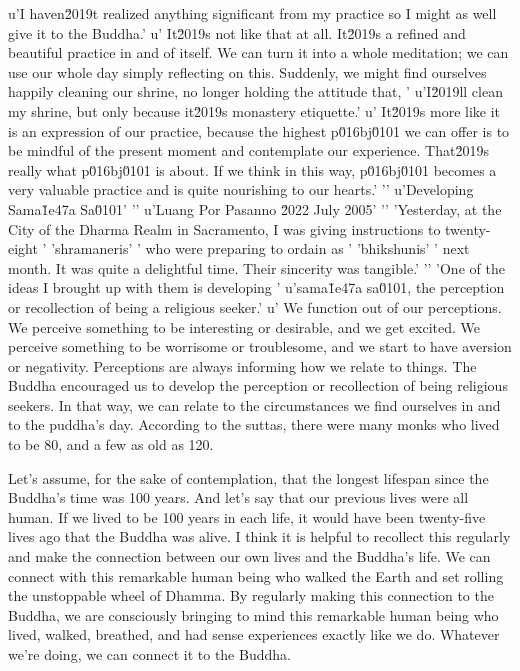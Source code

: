 u'I haven\u2019t realized anything significant from my practice so I might as well give it to the Buddha.'
u' It\u2019s not like that at all. It\u2019s a refined and beautiful practice in and of itself. We can turn it into a whole meditation; we can use our whole day simply reflecting on this. Suddenly, we might find ourselves happily cleaning our shrine, no longer holding the attitude that, '
u'I\u2019ll clean my shrine, but only because it\u2019s monastery etiquette.'
u' It\u2019s more like it is an expression of our practice, because the highest p\u016bj\u0101 we can offer is to be mindful of the present moment and contemplate our experience. That\u2019s really what p\u016bj\u0101 is about. If we think in this way, p\u016bj\u0101 becomes a very valuable practice and is quite nourishing to our hearts.'
'\n'
u'Developing Sama\u1e47a Sa\u0101'
'\n'
u'Luang Por Pasanno \u2022 July 2005'
'\n'
'Yesterday, at the City of the Dharma Realm in Sacramento, I was giving instructions to twenty-eight '
'shramaneris'
' who were preparing to ordain as '
'bhikshunis'
' next month. It was quite a delightful time. Their sincerity was tangible.'
'\n'
'One of the ideas I brought up with them is developing '
u'sama\u1e47a sa\u0101, the perception or recollection of being a religious seeker.'
u' We function out of our perceptions. We perceive something to be interesting or desirable, and we get excited. We perceive something to be worrisome or troublesome, and we start to have aversion or negativity. Perceptions are always informing how we relate to things. The Buddha encouraged us to develop the perception or recollection of being religious seekers. In that way, we can relate to the circumstances we find ourselves in and to the puddha's day. According to the suttas, there were many monks who 
lived to be 80, and a few as old as 120.

Let's assume, for the sake of contemplation, that the longest lifespan 
since the Buddha's time was 100 years. And let's say that our previous 
lives were all human. If we lived to be 100 years in each life, it 
would have been twenty-five lives ago that the Buddha was alive. I 
think it is helpful to recollect this regularly and make the connection 
between our own lives and the Buddha's life. We can connect with this 
remarkable human being who walked the Earth and set rolling the 
unstoppable wheel of Dhamma. By regularly making this connection to the 
Buddha, we are consciously bringing to mind this remarkable human being 
who lived, walked, breathed, and had sense experiences exactly like we 
do. Whatever we're doing, we can connect it to the Buddha.

